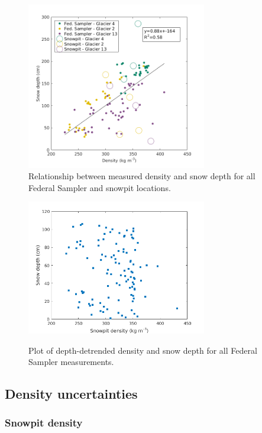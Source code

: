 \documentclass[12pt]{article}
\begin{document}
\begin{figure}[p]
	\centering
	\includegraphics[width =0.7\textwidth]{DepthDensity_SWEonly.png}\\
	\caption{Relationship between measured density and snow depth for all Federal Sampler and snowpit locations.}
	\label{fig:all_depth}

	\centering
	\includegraphics[width =0.7\textwidth]{DepthDensity_tubeDETREND.png}\\
	\caption{Plot of depth-detrended density and snow depth for all Federal Sampler measurements.}
	\label{fig:tube_depthDETREND}
\end{figure}



\subsection{Density uncertainties}

\subsubsection{Snowpit density}
\end{document}
